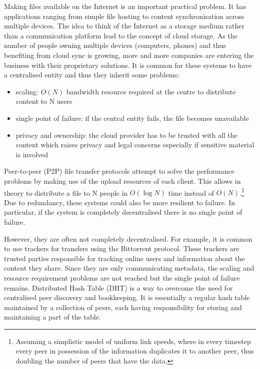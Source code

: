 \documentclass[12pt]{article}
\begin{document}
Making files available on the Internet is an important practical problem. It has applications ranging from simple file hosting to content synchronisation across multiple devices. The idea to think of the Internet as a storage medium rather than a communication platform lead to the concept of cloud storage. As the number of people owning multiple devices (computers, phones) and thus benefiting from cloud sync is growing, more and more companies are entering the business with their proprietary solutions. It is common for these systems to have a centralised entity and thus they inherit some problems:

\begin{itemize}
\item{scaling: $O(N)$ bandwidth resource required at the centre to distribute content to N users}
\item{single point of failure: if the central entity fails, the file becomes unavailable}
\item{privacy and ownership: the cloud provider has to be trusted with all the content which raises privacy and legal concerns especially if sensitive material is involved}
\end{itemize}

Peer-to-peer (P2P) file transfer protocols attempt to solve the performance problems by making use of the upload resources of each client. This allows in theory to distribute a file to N people in $O(\log N)$ time instead of $O(N)$.\footnote{Assuming a simplistic model of uniform link speeds, where in every timestep every peer in possession of the information duplicates it to another peer, thus doubling the number of peers that have the data.} Due to redundancy, these systems could also be more resilient to failure. In particular, if the system is completely decentralised there is no single point of failure.

However, they are often not completely decentralised. For example, it is common to use trackers for transfers using the Bittorrent protocol. These trackers are trusted parties responsible for tracking online users and information about the content they share. Since they are only communicating metadata, the scaling and resource requirement problems are not reached but the single point of failure remains. Distributed Hash Table (DHT) is a way to overcome the need for centralised peer discovery and bookkeeping. It is essentially a regular hash table maintained by a collection of peers, each having responsibility for storing and maintaining a part of the table.
\end{document}
